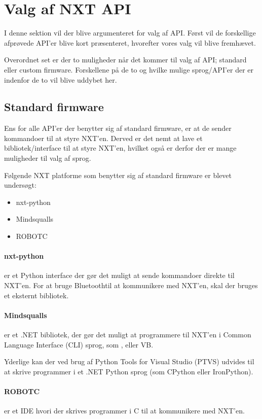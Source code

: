 \section{Valg af NXT API}
\label{nxt_api}

I denne sektion vil der blive argumenteret for valg af API.
Først vil de forskellige afprøvede API'er blive kort præsenteret, hvorefter vores valg vil blive fremhævet.

Overordnet set er der to muligheder når det kommer til valg af API; standard eller custom firmware.
Forskellene på de to og hvilke mulige sprog/API'er der er indenfor de to vil blive uddybet her.

\subsection{Standard firmware}
Ens for alle API'er der benytter sig af standard firmware, er at de sender kommandoer til at styre NXT'en.
Derved er det nemt at lave et bibliotek/interface til at styre NXT'en, hvilket også er derfor der er mange muligheder til valg af sprog.

Følgende NXT platforme som benytter sig af standard firmware er blevet undersøgt:
\begin{itemize}
\item{nxt-python}
\item{Mindsqualls}
\item{ROBOTC}
\end{itemize}

\paragraph{nxt-python} er et Python interface der gør det muligt at sende kommandoer direkte til NXT'en.
For at bruge Bluetooth\textregistered til at kommunikere med NXT'en, skal der bruges et eksternt bibliotek.\cite{nxt-python}

\paragraph{Mindsqualls} er et .NET bibliotek, der gør det muligt at programmere til NXT'en i Common Language Interface (CLI) sprog, som \csharp, \fsharp eller VB.\cite{mindsqualls}

Yderlige kan der ved brug af Python Tools for Visual Studio (PTVS) udvides til at skrive programmer i et .NET Python sprog (som CPython eller IronPython).\cite{ptvs}

\paragraph{ROBOTC} er et IDE hvori der skrives programmer i C til at kommunikere med NXT'en.\cite{robotc}

